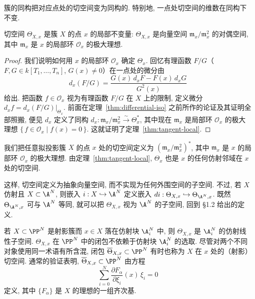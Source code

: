 \begin{corollary}\label{cor:tangent-iso}
	簇的同构把对应点处的切空间变为同构的. 特别地, 一点处切空间的维数在同构下不变.
\end{corollary}

\begin{theorem}\label{thm:tangent-local}
	切空间 $\Theta_{X,x}$ 是簇 $X$ 的点 $x$ 的局部不变量: $\Theta_{X,x}$ 是向量空间 $\mathfrak m_x/\mathfrak m_x^2$ 的对偶空间, 其中 $\mathfrak m_x$ 是 $x$ 的局部环 $\mathcal O_x$ 的极大理想.
\end{theorem}

\begin{proof}
	我们说明如何用 $x$ 的局部环 $\mathcal O_x$ 确定 $\Theta_x$. 回忆有理函数 $F/G$（$F, G \in k[T_1, \ldots, T_n]$, $G(x) \ne 0$）在一点处的微分由
	\[
		d_x(F/G) = \frac{G(x)\, d_x F - F(x)\, d_x G}{G^2(x)}
	\]
	给出. 把函数 $f \in \mathcal O_x$ 视为有理函数 $F/G$ 在 $X$ 上的限制, 定义微分 $d_x f = d_x(F/G)\big|_{\Theta_x}$. 前面在定理~\ref{thm:differential-iso} 之前所作的论证及其证明全部照搬, 便见 $d_x$ 定义了同构 $d_x: \mathfrak m_x/\mathfrak m_x^2 \overset{\sim}{\longrightarrow} \Theta_x^*$, 其中现在 $\mathfrak m_x$ 是局部环 $\mathcal O_x$ 的极大理想 $\{\, f \in \mathcal O_x \mid f(x) = 0 \,\}$. 这就证明了定理~\ref{thm:tangent-local}.
\end{proof}

我们把任意拟投影簇 $X$ 的点 $x$ 处的切空间定义为 $(\mathfrak m_x/\mathfrak m_x^2)^*$, 其中 $\mathfrak m_x$ 是 $x$ 的局部环 $\mathcal O_x$ 的极大理想. 由定理~\ref{thm:tangent-local}, $\Theta_x$ 也是 $x$ 的任何仿射邻域在 $x$ 处的切空间.

这样, 切空间定义为抽象向量空间, 而不实现为任何外围空间的子空间. 不过, 若 $X$ 仿射且 $X \subset \A^N$, 则嵌入 $i: X \hookrightarrow \A^N$ 定义嵌入 $d i: \Theta_{X,x} \hookrightarrow \Theta_{\A^N,x}$. 既然 $\Theta_{\A^N,x}$ 可与 $\A^N$ 等同, 就可以把 $\Theta_{X,x}$ 视为 $\A^N$ 的子空间, 回到 §1.2 给出的定义.

若 $X \subset \PP^N$ 是射影簇而 $x \in X$ 落在仿射块 $\A^N_i$ 中, 则 $\Theta_{X,x}$ 是 $\A^N_i$ 的仿射线性子空间. $\Theta_{X,x}$ 在 $\PP^N$ 中的闭包不依赖于仿射块 $\A^N_i$ 的选取. 尽管对两个不同对象使用同一术语有所含混, 闭包 $\overline{\Theta}_{X,x} \subset \PP^N$ 有时也称为 $X$ 在 $x$ 处的（射影）切空间. 通常的验证表明, $\overline{\Theta}_{X,x} \subset \PP^N$ 由方程
\[
	\sum_{i=0}^{N} \frac{\partial F_\alpha}{\partial \xi_i}(x)\, \xi_i = 0
\]
定义, 其中 $\{F_\alpha\}$ 是 $X$ 的理想的一组齐次基.

